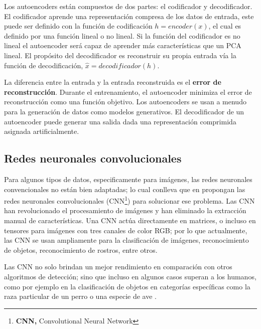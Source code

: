 Los autoencoders est\'{a}n compuestos de dos partes: el codificador y decodificador. El codificador aprende una representaci\'{o}n compresa de los datos de entrada, este puede ser definido con la funci\'{o}n de codificaci\'{o}n $h=encoder(x)$, el cual es definido por una funci\'{o}n lineal o no lineal. Si la funci\'{o}n del codificador es no lineal el autoencoder ser\'{a} capaz de aprender m\'{a}s caracter\'{i}sticas que un PCA lineal. El prop\'{o}sito del decodificador es reconstruir su propia entrada v\'{i}a la funci\'{o}n de decodificaci\'{o}n, $\hat{x} = decodificador(h)$.

\vspace{5mm} %

La diferencia entre la entrada y la entrada reconstruida es el \textbf{error de reconstrucción}. Durante el entrenamiento, el autoencoder minimiza el error de reconstrucción como una función objetivo. Los autoencoders se usan a menudo para la generación de datos como modelos generativos. El decodificador de un autoencoder puede generar una salida dada una representación comprimida asignada artificialmente.

\subsection{Redes neuronales convolucionales}

Para algunos tipos de datos, especificamente para im\'{a}genes, las redes neuronales convencionales no est\'{a}n bien adaptadas; lo cual conlleva que en \cite{48} propongan las redes neuronales convolucionales (CNN\footnote{\textbf{CNN,} Convolutional Neural Network}) para solucionar ese problema. Las CNN han revolucionado el procesamiento de im\'{a}genes y han eliminado la extracci\'{o}n manual de caracter\'{i}sticas. Una CNN act\'{u}a directamente en matrices, o incluso en tensores para im\'{a}genes con tres canales de color RGB; por lo que actualmente, las CNN se usan ampliamente para la clasificaci\'{o}n de im\'{a}genes, reconocimiento de objetos, reconocimiento de rostros, entre otros.

\vspace{5mm} %

Las CNN no solo brindan un mejor rendimiento en comparaci\'{o}n con otros algoritmos de detecci\'{o}n; sino que incluso en algunos casos superan a los humanos, como por ejemplo en la clasificaci\'{o}n de objetos en categor\'{i}as espec\'{i}ficas como la raza particular de un perro o una especie de ave \cite{49}.

